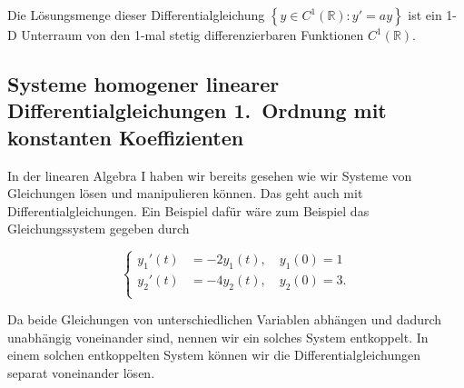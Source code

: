 Die Lösungsmenge dieser Differentialgleichung \( \left\{ y \in C^1(\mathbb{R}): y' = ay \right\} \) ist ein 1-D Unterraum von den 1-mal stetig differenzierbaren Funktionen \( C^1(\mathbb{R}) \).

\subsection{Systeme homogener linearer Differentialgleichungen 1.\ Ordnung mit konstanten Koeffizienten}

In der linearen Algebra I haben wir bereits gesehen wie wir Systeme von Gleichungen lösen und manipulieren können. Das geht auch mit Differentialgleichungen. Ein Beispiel dafür wäre zum Beispiel das Gleichungssystem gegeben durch

\begin{equation*}
    \left\{ 
        \begin{aligned}
            y_1'(t) &= -2 y_1(t), \quad y_1(0) = 1 \\
            y_2'(t) &= -4 y_2(t), \quad y_2(0) = 3. \\
        \end{aligned}
    \right.
\end{equation*}

\vspace{0.5\baselineskip}

Da beide Gleichungen von unterschiedlichen Variablen abhängen und dadurch unabhängig voneinander sind, nennen wir ein solches System entkoppelt. In einem solchen entkoppelten System können wir die Differentialgleichungen separat voneinander lösen. 

\newpage

